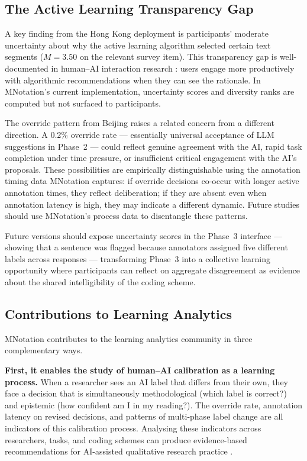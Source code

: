 \documentclass[fleqn,10pt]{JLA_article}
\begin{document}
\subsection{The Active Learning Transparency Gap}

A key finding from the Hong Kong deployment is participants' moderate uncertainty about why
the active learning algorithm selected certain text segments ($M = 3.50$ on the relevant
survey item). This transparency gap is well-documented in human--AI interaction research
\cite{amershi2019software}: users engage more productively with algorithmic recommendations
when they can see the rationale. In MNotation's current implementation, uncertainty scores
and diversity ranks are computed but not surfaced to participants.

The override pattern from Beijing raises a related concern from a different direction.
A 0.2\% override rate — essentially universal acceptance of LLM suggestions in Phase~2 —
could reflect genuine agreement with the AI, rapid task completion under time pressure, or
insufficient critical engagement with the AI's proposals. These possibilities are empirically
distinguishable using the annotation timing data MNotation captures: if override decisions
co-occur with longer active annotation times, they reflect deliberation; if they are absent
even when annotation latency is high, they may indicate a different dynamic. Future studies
should use MNotation's process data to disentangle these patterns.

Future versions should expose uncertainty scores in the Phase~3 interface — showing that a
sentence was flagged because annotators assigned five different labels across responses —
transforming Phase~3 into a collective learning opportunity where participants can reflect
on aggregate disagreement as evidence about the shared intelligibility of the coding scheme.

\subsection{Contributions to Learning Analytics}

MNotation contributes to the learning analytics community in three complementary ways.

\textbf{First, it enables the study of human--AI calibration as a learning process.}
When a researcher sees an AI label that differs from their own, they face a decision
that is simultaneously methodological (which label is correct?) and epistemic (how
confident am I in my reading?). The override rate, annotation latency on revised
decisions, and patterns of multi-phase label change are all indicators of this
calibration process. Analysing these indicators across researchers, tasks, and coding
schemes can produce evidence-based recommendations for AI-assisted qualitative research
practice \cite{jarvela2023human}.
\end{document}
